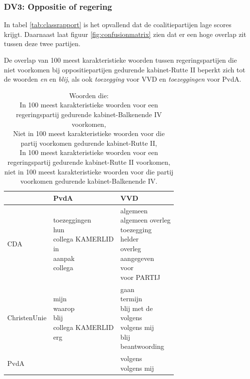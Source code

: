 \subsubsection{DV3: Oppositie of regering}
In tabel \ref{tab:classrapport} is het opvallend dat de coalitiepartijen lage scores krijgt. Daarnaast laat figuur \ref{fig:confusionmatrix} zien dat er een hoge overlap zit tussen deze twee partijen.\par
De overlap van 100 meest karakteristieke woorden tussen regeringspartijen die niet voorkomen bij oppositiepartijen gedurende kabinet-Rutte II beperkt zich tot de woorden \textit{en} en \textit{blij}, als ook \textit{toezegging} voor VVD en \textit{toezeggingen} voor PvdA.\par
\begin{table}[H]
\label{tab:overlapkabinetten}
\caption{Woorden die:\\
In 100 meest karakteristieke woorden voor een regeringspartij gedurende kabinet-Balkenende IV voorkomen,\\
Niet in 100 meest karakteristieke woorden voor die partij voorkomen gedurende kabinet-Rutte II,\\
In 100 meest karakteristieke woorden voor een regeringspartij gedurende kabinet-Rutte II voorkomen,\\
niet in 100 meest karakteristieke woorden voor die partij voorkomen gedurende kabinet-Balkenende IV.}
\centering
\begin{tabular}{|l|l|l|}
\toprule
      &   PvdA &    VVD\\
\midrule
         CDA &    \makecell[l]{toezeggingen\\hun\\collega KAMERLID\\in\\aanpak\\collega} &            \makecell[l]{algemeen\\algemeen overleg\\toezegging\\helder\\overleg\\aangegeven\\voor\\voor PARTIJ} \\ \hline
 ChristenUnie &  \makecell[l]{mijn\\waarop\\blij\\collega KAMERLID\\erg} &        \makecell[l]{gaan\\termijn\\blij met de\\volgens\\volgens mij\\blij\\beantwoording}  \\ \hline
  PvdA &   & \makecell[l]{volgens\\volgens mij}            \\
\bottomrule
\end{tabular}
\end{table}
